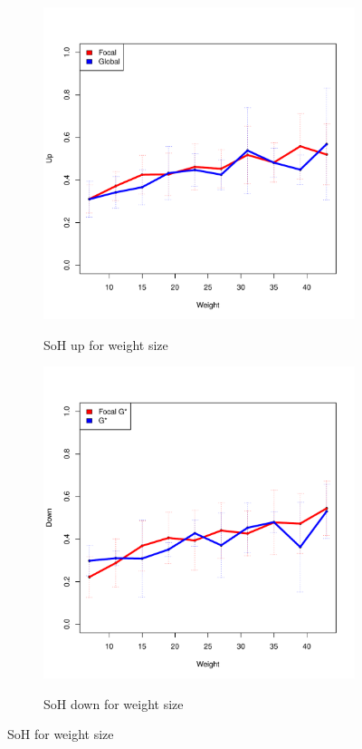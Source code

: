 \documentclass{itatnew}
\begin{document}
\begin{figure}[htp]
  \begin{subfigure}{\linewidth}
    \caption{SoH up for weight size}
    \includegraphics[width=\linewidth]{images/whiskerPlot/wUp}
    \label{fig:wUp}
  \end{subfigure}
  \hspace{1em}
  \begin{subfigure}{\linewidth}
    \caption{SoH down for weight size}
    \includegraphics[width=\linewidth]{images/whiskerPlot/wDown}
    \label{fig:wDown}
  \end{subfigure}
  \caption{SoH for weight size}
  \label{fig:SoHWeight}
\end{figure}
\end{document}
